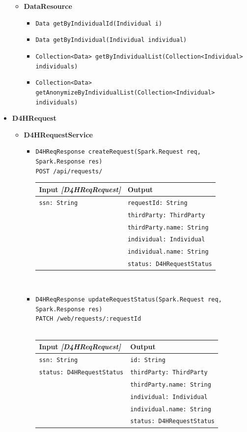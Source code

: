 \documentclass[a4paper, hidelinks, 12pt]{report}
\begin{document}
\begin{itemize}
\begin{itemize}
				\item{\textbf{DataResource}}
					\begin{itemize}
						\item{\verb|Data getByIndividualId(Individual i)|}
						\item{\verb|Data getByIndividual(Individual individual)|}
						\item{\verb|Collection<Data> getByIndividualList(Collection<Individual> individuals)|}
						\item{\verb|Collection<Data> getAnonymizeByIndividualList(Collection<Individual> individuals)|}
					\end{itemize}
			\end{itemize}
			
		\item{\textbf{D4HRequest}}
			\begin{itemize}
				\item{\textbf{D4HRequestService}}
					\begin{itemize}
			\item{\verb|D4HReqResponse createRequest(Spark.Request req, Spark.Response res)|\\ \verb|POST /api/requests/|}\\
			\begin{tabular}{l | l}
			\textbf{Input} \textit{[D4HReqRequest]}  & \textbf{Output} \\
			\hline
				\verb|ssn: String| & \verb|requestId: String| \\
				& \verb|thirdParty: ThirdParty|\\
				& \verb|thirdParty.name: String|\\
				& \verb|individual: Individual|\\
				& \verb|individual.name: String|\\
				& \verb|status: D4HRequestStatus|\\
			\end{tabular}\\
			
			\item{\verb|D4HReqResponse updateRequestStatus(Spark.Request req, Spark.Response res)|\\ \verb|PATCH /web/requests/:requestId|}\\\\
			\begin{tabular}{l | l}
			\textbf{Input} \textit{[D4HReqRequest]} & \textbf{Output} \\
			\hline
				\verb|ssn: String| & \verb|id: String|\\
				\verb|status: D4HRequestStatus| & \verb|thirdParty: ThirdParty|\\
				& \verb|thirdParty.name: String|\\
				& \verb|individual: Individual|\\
				& \verb|individual.name: String|\\
				& \verb|status: D4HRequestStatus|\\
			\end{tabular}\\
			

\end{itemize}
\end{itemize}
\end{itemize}
\end{document}
